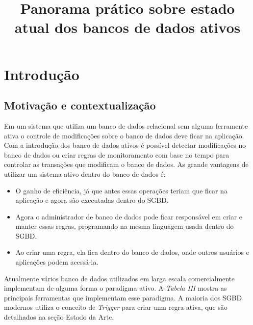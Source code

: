\documentclass[conference]{IEEEtran}
\begin{document}
\title{Panorama prático sobre estado atual dos bancos de dados ativos}

\author{
}

\maketitle
\IEEEpeerreviewmaketitle

\section{Introdução}
  \subsection{Motivação e contextualização}
  Em um sistema que utiliza um banco de dados relacional sem alguma ferramente ativa o controle de modificações sobre o banco de dados deve ficar na aplicação. Com a introdução dos banco de dados
  ativos é possível detectar modificações no banco de dados ou criar regras de monitoramento com base no tempo para controlar as transações que modificam o banco de dados. As grande vantagens
  de utilizar um sistema ativo dentro do banco de dados é:
  \begin{itemize}
    \item O ganho de eficiência, já que antes essas operações teriam que ficar na aplicação e agora são executadas dentro do SGBD. \\
    \item Agora o administrador de banco de dados pode ficar responsável em criar e manter essas regras, programando na mesma linguagem usada dentro do SGBD.\\
    \item Ao criar uma regra, ela fica dentro do banco de dados, onde outros usuários e aplicações podem acessá-la.
  \end{itemize}
  Atualmente vários banco de dados utilizados em larga escala comercialmente implementam de alguma forma o paradigma ativo. A \textit{Tabela III} mostra as principais ferramentas que implementam
  esse paradigma. A maioria dos SGBD modernos utiliza o conceito de \textit{Trigger} para criar uma regra ativa, que são detalhados na seção Estado da Arte.
\end{document}
